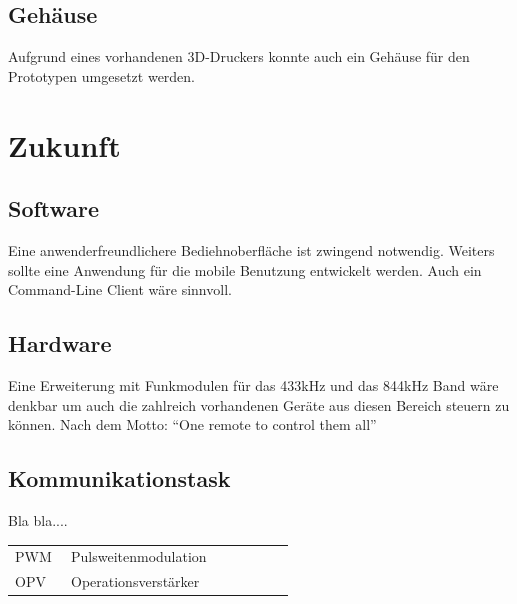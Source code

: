 \documentclass[11pt,a4paper,bibtotoc,oneside]{scrbook}
\begin{document}
\section{Gehäuse}
Aufgrund eines vorhandenen 3D-Druckers konnte auch ein Gehäuse für den Prototypen umgesetzt werden.

\chapter{Zukunft}

\section{Software}
Eine anwenderfreundlichere Bediehnoberfläche ist zwingend notwendig. Weiters sollte eine Anwendung für die
mobile Benutzung entwickelt werden. Auch ein Command-Line Client wäre sinnvoll.

\section{Hardware}
Eine Erweiterung mit Funkmodulen für das 433kHz und das 844kHz Band wäre denkbar um auch die zahlreich vorhandenen
Geräte aus diesen Bereich steuern zu können. Nach dem Motto: ``One remote to control them all''

\section{Kommunikationstask}
Bla bla....




%
%

%

\hspace{-17mm}\begin{tabular}{>{\raggedleft}p{0.2\linewidth} p{0.75\linewidth} p{0.1\linewidth}}
PWM & Pulsweitenmodulation \\
OPV & Operationsverstärker
\end{tabular}
\end{document}
